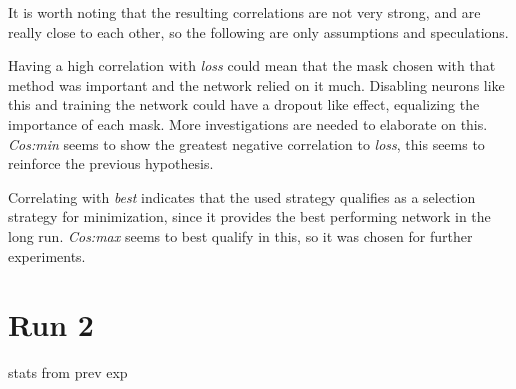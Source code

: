 \documentclass[12pt]{report}
\begin{document}
It is worth noting that the resulting correlations are not very strong, and are really close to each other, so the following are only assumptions and speculations.

Having a high correlation with \textit{loss} could mean that the mask chosen with that method was important and the network relied on it much. Disabling neurons like this and training the network could have a dropout like effect, equalizing the importance of each mask. More investigations are needed to elaborate on this. \textit{Cos:min} seems to show the greatest negative correlation to \textit{loss}, this seems to reinforce the previous hypothesis.

Correlating with \textit{best} indicates that the used strategy qualifies as a selection strategy for minimization, since it provides the best performing network in the long run. \textit{Cos:max} seems to best qualify in this, so it was chosen for further experiments.

\section{Run 2}
stats from prev exp
\end{document}

